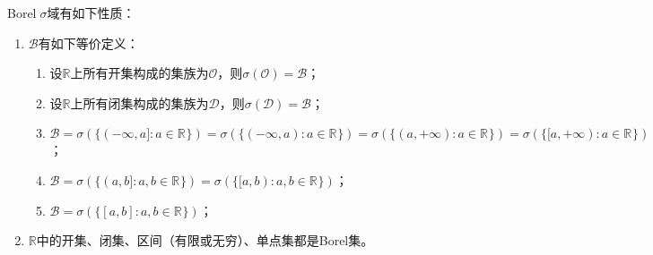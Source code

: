 \begin{property}\label{prop:BorelSigmaField}
	Borel$\;\sigma$域有如下性质：	
	\begin{enumerate}
		\item $\mathcal{B}$有如下等价定义：
		\begin{enumerate}
			\item 设$\mathbb{R}$上所有开集构成的集族为$\mathcal{O}$，则$\sigma(\mathcal{O})=\mathcal{B}$；
			\item 
			设$\mathbb{R}$上所有闭集构成的集族为$\mathcal{D}$，则$\sigma(\mathcal{D})=\mathcal{B}$；
			\item $\mathcal{B}=\sigma(\{(-\infty,a]:a\in\mathbb{R}^{}\})=\sigma(\{(-\infty,a):a\in\mathbb{R}^{}\})=\sigma(\{(a,+\infty):a\in\mathbb{R}^{}\})=\sigma(\{[a,+\infty):a\in\mathbb{R}^{}\})$；
			\item $\mathcal{B}=\sigma(\{(a,b]:a,b\in\mathbb{R}^{}\})=\sigma(\{[a,b):a,b\in\mathbb{R}^{}\})$；
			\item $\mathcal{B}=\sigma(\{[a,b]:a,b\in\mathbb{R}^{}\})$；
		\end{enumerate}
		\item $\mathbb{R}$中的开集、闭集、区间（有限或无穷）、单点集都是Borel集。
	\end{enumerate}
\end{property}
